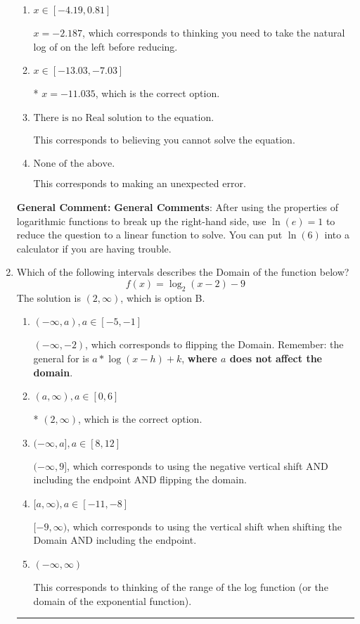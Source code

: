 \documentclass{extbook}[14pt]
\newcommand{\litem}[1]{\item #1

\rule{\textwidth}{0.4pt}}
\begin{document}
\begin{enumerate}
{\begin{enumerate}[label=\Alph*.]
$x = -5.368$, which corresponds to treating any root as a square root.
\item \( x \in [-4.19, 0.81] \)

$x = -2.187$, which corresponds to thinking you need to take the natural log of on the left before reducing.
\item \( x \in [-13.03, -7.03] \)

* $x = -11.035$, which is the correct option.
\item \( \text{There is no Real solution to the equation.} \)

This corresponds to believing you cannot solve the equation.
\item \( \text{None of the above.} \)

This corresponds to making an unexpected error.
\end{enumerate}

\textbf{General Comment:} \textbf{General Comments}: After using the properties of logarithmic functions to break up the right-hand side, use $\ln(e) = 1$ to reduce the question to a linear function to solve. You can put $\ln(6)$ into a calculator if you are having trouble.
}
\litem{
Which of the following intervals describes the Domain of the function below?
\[ f(x) = \log_2{(x-2)}-9 \]The solution is \( (2, \infty) \), which is option B.\begin{enumerate}[label=\Alph*.]
\item \( (-\infty, a), a \in [-5, -1] \)

$(-\infty, -2)$, which corresponds to flipping the Domain. Remember: the general for is $a*\log(x-h)+k$, \textbf{where $a$ does not affect the domain}.
\item \( (a, \infty), a \in [0, 6] \)

* $(2, \infty)$, which is the correct option.
\item \( (-\infty, a], a \in [8, 12] \)

$(-\infty, 9]$, which corresponds to using the negative vertical shift AND including the endpoint AND flipping the domain.
\item \( [a, \infty), a \in [-11, -8] \)

$[-9, \infty)$, which corresponds to using the vertical shift when shifting the Domain AND including the endpoint.
\item \( (-\infty, \infty) \)

This corresponds to thinking of the range of the log function (or the domain of the exponential function).
\end{enumerate}

}
\end{enumerate}
\end{document}
